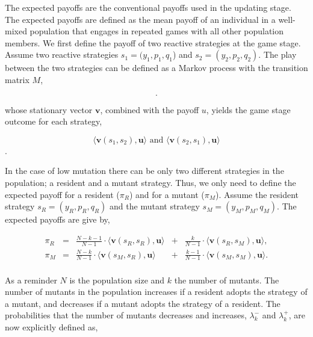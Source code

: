 \documentclass[11pt]{article}
\theoremstyle{plainCl1}
\theoremstyle{plainCl2}
\begin{document}
The expected payoffs are the conventional payoffs used in the updating stage.
The expected payoffs are defined as the mean payoff of an individual in a
well-mixed population that engages in repeated games with all other population
members. We first define the payoff of two reactive strategies at the game
stage. Assume two reactive strategies $s_1\!=\!(y_1, p_1, q_1$) and
$s_2\!=\!(y_2,p_2,q_2)$. The play between the two strategies can be defined as a
Markov process with the transition matrix \(M\),

\begin{equation}\label{eq:transition_matrix}
  .
\end{equation}

whose stationary vector \(\mathbf{v}\), combined with the payoff \(u\), yields
the game stage outcome for each strategy,

\[\langle\mathbf{v}(s_1,s_2),\mathbf{u}\rangle \text{ and } \langle\mathbf{v}(s_2,s_1), \mathbf{u}\rangle\].

In the case of low mutation there can be only two different
strategies in the population; a resident and a mutant strategy. Thus, we
only need to define the expected
payoff for a resident (\(\pi_R\)) and for a mutant (\(\pi_M\)). Assume the
resident strategy \(s_R = (y_R, p_R, q_R)\) and the mutant strategy \(s_M =
(y_M, p_M, q_M)\). The expected payoffs are give by,

\begin{equation} \label{Eq:ExpPay}
  \begin{array}{lcrcr}
  \displaystyle \pi_R & = &\displaystyle \frac{N\!-\!k\!-\!1}{N-1}\cdot \langle\mathbf{v}(s_R,s_R),\mathbf{u}\rangle	&+	&\displaystyle\frac{k}{N-1}\cdot \langle\mathbf{v}(s_R,s_M),\mathbf{u}\rangle,\\[0.5cm]
  \displaystyle \pi_M & = &\displaystyle\frac{N-k}{N-1}\cdot \langle\mathbf{v}(s_M,s_R),\mathbf{u}\rangle&+	&\displaystyle\frac{k-1}{N-1}\cdot \langle\mathbf{v}(s_M,s_M),\mathbf{u}\rangle.\\
  \end{array}
\end{equation}

As a reminder \(N\) is the population size and \(k\) the number of mutants. The
number of mutants in the population increases if a resident adopts the strategy
of a mutant, and decreases if a mutant adopts the strategy of a resident. The
probabilities that the number of mutants decreases and increases,
\(\lambda^-_k\) and \(\lambda^+_k\), are now explicitly defined as,
\end{document}
